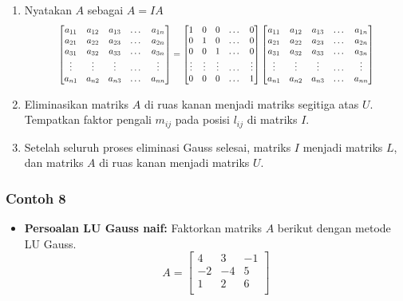 \documentclass[pdflatex,compress,mathserif]{beamer}
\newcommand*{\Scale}[2][4]{\scalebox{#1}{$#2$}}%
\begin{document}
\begin{frame}
	\begin{enumerate}
		\item Nyatakan $ A $ sebagai $ A = IA $
		\[\Scale[0.8]{
		\begin{bmatrix}
			a_{11} & a_{12} & a_{13} & \dots & a_{1n}\\
			a_{21} & a_{22} & a_{23} & \dots & a_{2n}\\
			a_{31} & a_{32} & a_{33} & \dots & a_{3n}\\
			\vdots & \vdots & \vdots & \dots & \vdots\\
			a_{n1} & a_{n2} & a_{n3} & \dots & a_{nn}
		\end{bmatrix}
		=
		\begin{bmatrix}
			1 & 0 & 0 & \dots & 0\\
			0 & 1 & 0 & \dots & 0\\
			0 & 0 & 1 & \dots & 0\\
			\vdots & \vdots & \vdots & \dots & \vdots\\
			0 & 0 & 0 & \dots & 1
		\end{bmatrix}
		\begin{bmatrix}
			a_{11} & a_{12} & a_{13} & \dots & a_{1n}\\
			a_{21} & a_{22} & a_{23} & \dots & a_{2n}\\
			a_{31} & a_{32} & a_{33} & \dots & a_{3n}\\
			\vdots & \vdots & \vdots & \dots & \vdots\\
			a_{n1} & a_{n2} & a_{n3} & \dots & a_{nn}
		\end{bmatrix}
		}\]
		\item Eliminasikan matriks $ A $ di ruas kanan menjadi matriks segitiga atas $ U $.
		Tempatkan faktor pengali $ m_{ij} $ pada posisi $ l_{ij} $ di matriks $ I $.
		\item Setelah seluruh proses eliminasi Gauss selesai, matriks $ I $ menjadi matriks $ L $, dan matriks $ A $ di ruas kanan menjadi matriks $ U $.
	\end{enumerate}
\end{frame}

\begin{frame}
	\frametitle{Contoh 8}
	\begin{itemize}
		\item \textbf{Persoalan LU Gauss naif:} Faktorkan matriks $ A $ berikut dengan metode LU Gauss.
		\[ A = 
		\begin{bmatrix}
			4 & 3 & -1\\
			-2 & -4 & 5\\
			1 & 2 & 6\\
		\end{bmatrix}
		\]
	\end{itemize}
\end{frame}
\end{document}
